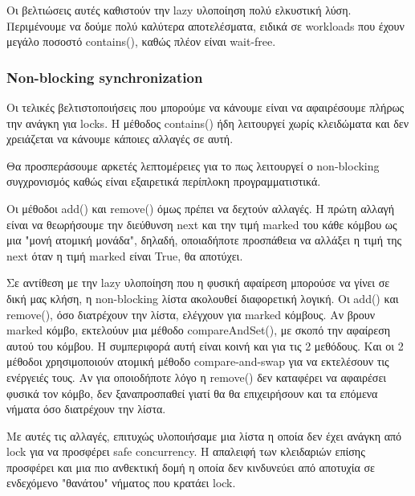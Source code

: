 \documentclass[../final_report.tex]{subfiles}
\begin{document}
Οι βελτιώσεις αυτές καθιστούν την lazy υλοποίηση πολύ ελκυστική λύση. Περιμένουμε να δούμε πολύ καλύτερα αποτελέσματα, ειδικά 
σε workloads που έχουν μεγάλο ποσοστό contains(), καθώς πλέον είναι wait-free. 

\subsubsection{Non-blocking synchronization}
Οι τελικές βελτιστοποιήσεις που μπορούμε να κάνουμε είναι να αφαιρέσουμε πλήρως την ανάγκη για locks. Η μέθοδος contains() ήδη λειτουργεί
χωρίς κλειδώματα και δεν χρειάζεται να κάνουμε κάποιες αλλαγές σε αυτή.

Θα προσπεράσουμε αρκετές λεπτομέρειες για το πως λειτουργεί ο non-blocking συγχρονισμός καθώς είναι εξαιρετικά περίπλοκη προγραμματιστικά.

Οι μέθοδοι add() και remove() όμως πρέπει να δεχτούν αλλαγές. Η πρώτη αλλαγή είναι να θεωρήσουμε την διεύθυνση next και την τιμή
marked του κάθε κόμβου ως μια "μονή ατομική μονάδα", δηλαδή, οποιαδήποτε προσπάθεια να αλλάξει η τιμή της next όταν η τιμή marked είναι
True, θα αποτύχει.

Σε αντίθεση με την lazy υλοποίηση που η φυσική αφαίρεση μπορούσε να γίνει σε δική μας κλήση, η non-blocking λίστα ακολουθεί διαφορετική λογική.
Οι add() και remove(), όσο διατρέχουν την λίστα, ελέγχουν για marked κόμβους. Αν βρουν marked κόμβο, εκτελούυν μια μέθοδο compareAndSet(), με σκοπό
την αφαίρεση αυτού του κόμβου. Η συμπεριφορά αυτή είναι κοινή και για τις 2 μεθόδους. Και οι 2 μέθοδοι χρησιμοποιούν ατομική μέθοδο compare-and-swap
για να εκτελέσουν τις ενέργειές τους. Αν για οποιοδήποτε λόγο η remove() δεν καταφέρει να αφαιρέσει φυσικά τον κόμβο, δεν ξαναπροσπαθεί γιατί θα 
θα επιχειρήσουν και τα επόμενα νήματα όσο διατρέχουν την λίστα.

Με αυτές τις αλλαγές, επιτυχώς υλοποιήσαμε μια λίστα η οποία δεν έχει ανάγκη από lock για να προσφέρει safe concurrency. Η απαλειφή των κλειδαριών
επίσης προσφέρει και μια πιο ανθεκτική δομή η οποία δεν κινδυνεύει από αποτυχία σε ενδεχόμενο "θανάτου" νήματος που κρατάει lock.
\end{document}
